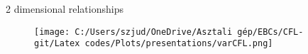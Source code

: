 \documentclass[notes]{beamer}
\begin{document}
\begin{frame}[label=2dim]{2 dimensional relationships}
\begin{figure}[H]  %
    \centering
    \texttt{[image: C:/Users/szjud/OneDrive/Asztali gép/EBCs/CFL-git/Latex codes/Plots/presentations/varCFL.png]}
\end{figure}
\restoregeometry %
\begin{center}
\hyperlink{nameit}{}
\end{center}

\end{frame}
\end{document}
